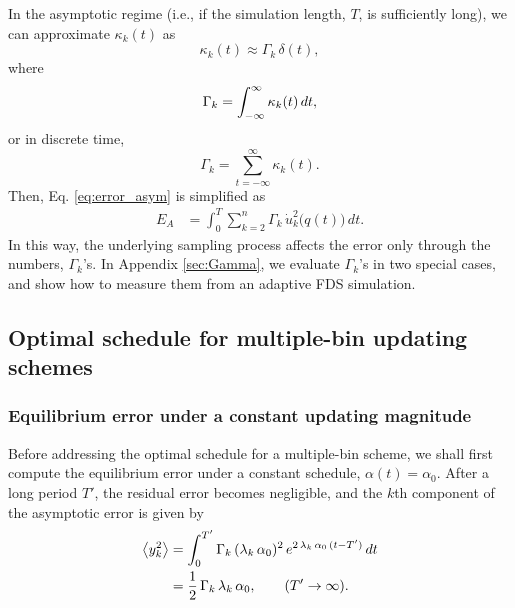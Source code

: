 \documentclass[reprint, floatfix]{revtex4-1}
\newcommand{\Err}{E}
\begin{document}
In the asymptotic regime
(i.e., if the simulation length, $T$, is sufficiently long),
we can approximate $\kappa_k(t)$ as
%
\begin{equation}
  \kappa_k(t) \approx \Gamma_k \, \delta(t)
  ,
\label{eq:kappa_delta}
\end{equation}
%
where
\begin{equation}
  \Gamma_k = \int_{-\infty}^\infty \kappa_k(t) \, dt,
  \notag
\end{equation}
or in discrete time,
\begin{equation}
  \Gamma_k = \sum_{t = -\infty}^\infty \kappa_k(t).
  \label{eq:Gamma_sum}
\end{equation}
%
Then, Eq. \eqref{eq:error_asym} is simplified as
%
\begin{align}
  \Err_A
  &=
  \int_0^T
  \sum_{k = 2}^n
  \Gamma_k \, \dot u_k^2\bigl( q(t) \bigr) \, dt.
\label{eq:error_asym1}
\end{align}
%
In this way,
the underlying sampling process
affects the error only through the numbers,
$\Gamma_k$'s.
%
In Appendix \ref{sec:Gamma},
we evaluate $\Gamma_k$'s in two special cases,
and show how to measure them
from an adaptive FDS simulation.



\subsection{\label{sec:mbin_opta}
Optimal schedule for multiple-bin updating schemes}



\subsubsection{\label{sec:eqlerr}
Equilibrium error under a constant updating magnitude
}



Before addressing the optimal schedule
for a multiple-bin scheme,
we shall first compute the equilibrium error
under a constant schedule,
$\alpha(t) = \alpha_0$.
%
After a long period $T'$,
the residual error becomes negligible, and
the $k$th component of the asymptotic error
is given by
%
%
%
\begin{align}
  \left\langle
    y_k^2
  \right\rangle
  &=
  \int_0^{T'}
    \Gamma_k \, (\lambda_k \, \alpha_0)^2 \,
      e^{ 2 \, \lambda_k \, \alpha_0 \, (t - T') }
    \, dt
  \notag
  \\
  &=
  \frac 1 2 \, \Gamma_k \, \lambda_k \, \alpha_0
  ,
  \qquad
  ( T' \to \infty )
  .
\label{eq:y2_eql}
\end{align}
%
\end{document}
